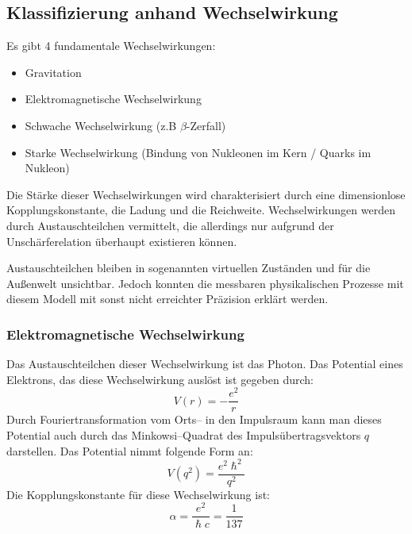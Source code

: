 \documentclass[Ex4_Zusammenfassung.tex]{subfiles}
\begin{document}
\subsection{Klassifizierung anhand Wechselwirkung}
Es gibt 4 fundamentale Wechselwirkungen:
\begin{itemize}
	\item Gravitation
	\item Elektromagnetische Wechselwirkung
	\item Schwache Wechselwirkung (z.B $\beta$-Zerfall)
	\item Starke Wechselwirkung (Bindung von Nukleonen im Kern / Quarks im Nukleon)
\end{itemize}
Die Stärke dieser Wechselwirkungen wird charakterisiert durch eine dimensionlose Kopplungskonstante, die Ladung und die Reichweite.
Wechselwirkungen werden durch Austauschteilchen vermittelt, die allerdings nur aufgrund der Unschärferelation überhaupt existieren können.

Austauschteilchen bleiben in sogenannten virtuellen Zuständen und für die Außenwelt unsichtbar. Jedoch konnten die messbaren physikalischen Prozesse mit diesem Modell mit sonst nicht erreichter Präzision erklärt werden.

\subsubsection{Elektromagnetische Wechselwirkung}
Das Austauschteilchen dieser Wechselwirkung ist das Photon.
Das Potential eines Elektrons, das diese Wechselwirkung auslöst ist gegeben durch:
\begin{equation}
	V(r) = -  \frac{e^2}{r}
\end{equation}
Durch Fouriertransformation vom Orts-- in den Impulsraum kann man dieses Potential auch durch das Minkowsi--Quadrat des Impulsübertragsvektors $q$ darstellen. Das Potential nimmt folgende Form an: 
\begin{equation}
	V(q^2) = \frac{e^2 \hslash^2}{q^2}
\end{equation}
Die Kopplungskonstante für diese Wechselwirkung ist: 
\begin{equation}
	\alpha = \frac{e^2}{\hslash c} = \frac{1}{137}
\end{equation} 
\end{document}
